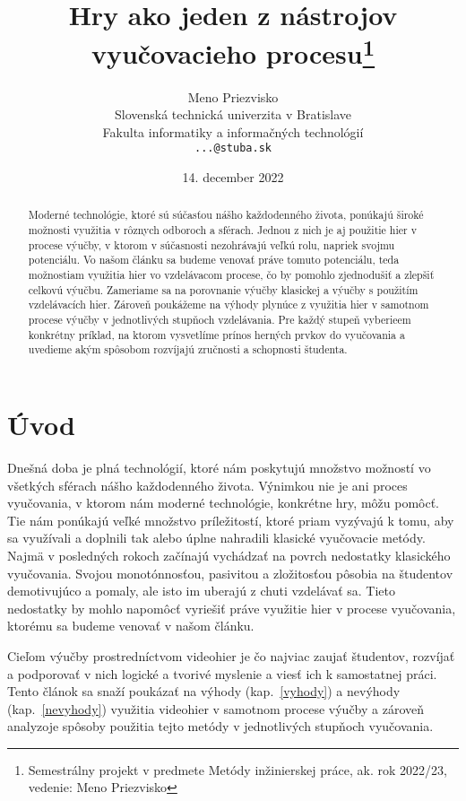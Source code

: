 \documentclass[10pt,twoside,slovak,a4paper]{article}
\title{Hry ako jeden z nástrojov vyučovacieho procesu\thanks{Semestrálny projekt v predmete Metódy inžinierskej práce, ak. rok 2022/23, vedenie: Meno Priezvisko}}
\author{Meno Priezvisko\\[2pt]
	{\small Slovenská technická univerzita v Bratislave}\\
	{\small Fakulta informatiky a informačných technológií}\\
	{\small \texttt{...@stuba.sk}}
	}
\date{\small 14. december 2022}
\begin{document}
\maketitle

\begin{abstract}

Moderné technológie, ktoré sú súčasťou nášho každodenného života, ponúkajú široké možnosti využitia v rôznych odboroch a sférach. Jednou z nich je aj použitie hier v procese výučby, v ktorom v súčasnosti nezohrávajú veľkú rolu, napriek svojmu potenciálu. Vo našom článku sa budeme venovať práve tomuto potenciálu, teda možnostiam využitia hier vo vzdelávacom procese, čo by pomohlo zjednodušiť a zlepšiť celkovú výučbu. Zameriame sa na porovnanie výučby klasickej a výučby s použitím vzdelávacích hier. Zároveň poukážeme na výhody plynúce z využitia hier v samotnom procese výučby v jednotlivých stupňoch vzdelávania. Pre každý stupeň vyberieem konkrétny príklad, na ktorom vysvetlíme prínos herných prvkov do vyučovania a uvedieme akým spôsobom rozvíjajú zručnosti a schopnosti študenta.

\end{abstract}



\section{Úvod}

Dnešná doba je plná technológií, ktoré nám poskytujú množstvo možností vo všetkých sférach nášho každodenného života. Výnimkou nie je ani proces vyučovania, v ktorom nám moderné technológie, konkrétne hry\cite{Zea2009-eh}, môžu pomôcť. Tie nám ponúkajú veľké množstvo príležitostí, ktoré priam vyzývajú k tomu, aby sa využívali a doplnili tak alebo úplne nahradili klasické vyučovacie metódy. Najmä v posledných rokoch začínajú vychádzať na povrch nedostatky klasického vyučovania. Svojou monotónnosťou, pasivitou a zložitosťou pôsobia na študentov demotivujúco a pomaly, ale isto im uberajú z chuti vzdelávať sa. Tieto nedostatky by mohlo napomôcť vyriešiť práve využitie hier v procese vyučovania, ktorému sa budeme venovať v našom článku. 

Cieľom výučby prostredníctvom videohier je čo najviac zaujať študentov, rozvíjať a podporovať v nich logické a tvorivé myslenie a viesť ich k samostatnej práci\cite{Chen2012-ao}. Tento článok sa snaží poukázať na výhody (kap.~\ref{vyhody}) a nevýhody (kap.~\ref{nevyhody}) využitia videohier v samotnom procese výučby a zároveň analyzoje spôsoby použitia tejto metódy v jednotlivých stupňoch vyučovania.
\end{document}
